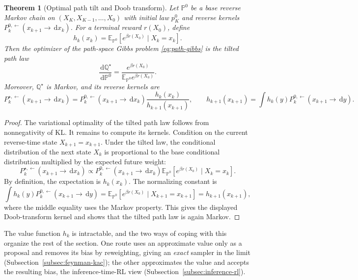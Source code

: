 \documentclass[10pt,a4paper]{amsart}
\numberwithin{equation}{section}
\newtheorem{theorem}{Theorem}[section]
\newcommand{\E}{\mathbb{E}}
\newcommand{\Pp}{\mathbb{P}}
\newcommand{\dd}{\,\mathrm{d}}
\begin{document}
\begin{theorem}[Optimal path tilt and Doob transform]
\label{thm:path-doob-transform}
Let $\Pp^0$ be a base reverse Markov chain on
$(X_K,X_{K-1},\ldots,X_0)$ with initial law $p_K^0$ and reverse kernels
$P_k^{0,\leftarrow}(x_{k+1}\to \dd x_k)$.  For a terminal reward
$r(X_0)$, define
\[
    h_k(x_k)
    =
    \E_{\Pp^0}\!\left[e^{\beta r(X_0)}\mid X_k=x_k\right].
\]
Then the optimizer of the path-space Gibbs problem
\eqref{eq:path-gibbs} is the tilted path law
\[
    \frac{\dd\mathbb Q^\star}{\dd\Pp^0}
    =
    \frac{e^{\beta r(X_0)}}{\E_{\Pp^0}e^{\beta r(X_0)}}.
\]
Moreover, $\mathbb Q^\star$ is Markov, and its reverse kernels are
\begin{equation}\label{eq:guided-reverse-kernel}
    P_k^{\star,\leftarrow}(x_{k+1}\to \dd x_k)
    =
    P_k^{0,\leftarrow}(x_{k+1}\to \dd x_k)
    \frac{h_k(x_k)}{h_{k+1}(x_{k+1})},
    \qquad
    h_{k+1}(x_{k+1})
    =
    \int h_k(y)P_k^{0,\leftarrow}(x_{k+1}\to \dd y).
\end{equation}
\end{theorem}

\begin{proof}
The variational optimality of the tilted path law follows from nonnegativity of
KL\@.  It remains to compute its kernels.  Condition on the current reverse-time
state $X_{k+1}=x_{k+1}$.  Under the tilted law, the
conditional distribution of the next state $X_k$ is proportional to the base
conditional distribution multiplied by the expected future weight:
\[
    P_k^{\star,\leftarrow}(x_{k+1}\to \dd x_k)
    \propto
    P_k^{0,\leftarrow}(x_{k+1}\to \dd x_k)
    \E_{\Pp^0}\!\left[e^{\beta r(X_0)}\mid X_k=x_k\right].
\]
By definition, the expectation is $h_k(x_k)$.  The normalizing constant is
\[
    \int h_k(y)P_k^{0,\leftarrow}(x_{k+1}\to \dd y)
    =
    \E_{\Pp^0}\!\left[e^{\beta r(X_0)}\mid X_{k+1}=x_{k+1}\right]
    =
    h_{k+1}(x_{k+1}),
\]
where the middle equality uses the Markov property.  This gives the displayed
Doob-transform kernel and shows that the tilted path law is again Markov.
\end{proof}


The value function $h_k$ is intractable, and the two ways of coping with this
organize the rest of the section.  One route uses an approximate value only as a
proposal and removes its bias by reweighting, giving an \emph{exact} sampler in
the limit (Subsection~\ref{subsec:feynman-kac}); the other approximates the value
and accepts the resulting bias, the inference-time-RL view
(Subsection~\ref{subsec:inference-rl}).
\end{document}
